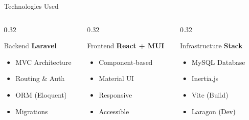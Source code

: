 \documentclass[aspectratio=169,11pt]{beamer}
\newcommand{\cmark}{\textcolor{accent3}{\ding{51}}}
\begin{document}
\begin{frame}{Technologies Used}

\begin{columns}[T]
  \begin{column}{0.32\textwidth}
    \begin{block}{Backend}
      \textbf{\textcolor{accent1}{Laravel}}
      \begin{itemize}
        \item[\cmark] MVC Architecture
        \item[\cmark] Routing \& Auth
        \item[\cmark] ORM (Eloquent)
        \item[\cmark] Migrations
      \end{itemize}
    \end{block}
  \end{column}
  
  \begin{column}{0.32\textwidth}
    \begin{block}{Frontend}
      \textbf{\textcolor{accent1}{React + MUI}}
      \begin{itemize}
        \item[\cmark] Component-based
        \item[\cmark] Material UI
        \item[\cmark] Responsive
        \item[\cmark] Accessible
      \end{itemize}
    \end{block}
  \end{column}
  
  \begin{column}{0.32\textwidth}
    \begin{block}{Infrastructure}
      \textbf{\textcolor{accent1}{Stack}}
      \begin{itemize}
        \item[\cmark] MySQL Database
        \item[\cmark] Inertia.js
        \item[\cmark] Vite (Build)
        \item[\cmark] Laragon (Dev)
      \end{itemize}
    \end{block}
  \end{column}
\end{columns}

\end{frame}
\end{document}
